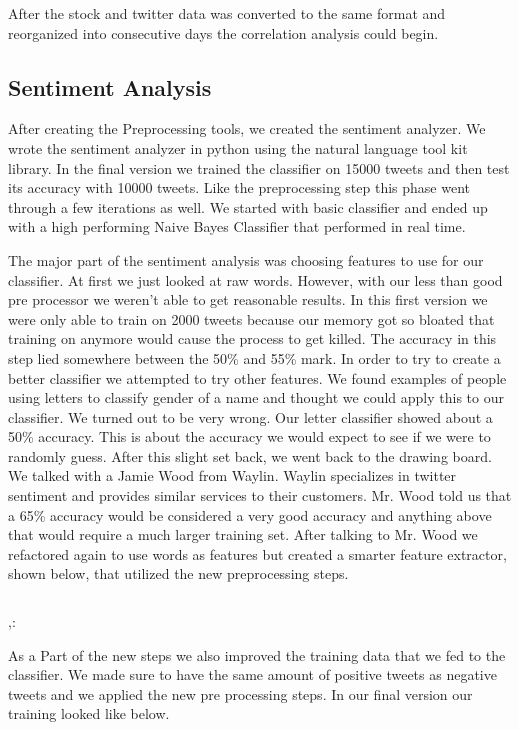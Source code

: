 \documentclass{acm_proc_article-sp}
\begin{document}
After the stock and twitter data was converted to the same format and
reorganized into consecutive days the correlation analysis could begin. 

\subsection{Sentiment Analysis}

After creating the Preprocessing tools, we created the sentiment analyzer.  We
wrote the sentiment analyzer in python using the natural language tool kit
library. In the final version we trained the classifier on 15000 tweets and
then test its accuracy with 10000 tweets. Like the preprocessing step this
phase went through a few iterations as well. We started with basic classifier
and ended up with a high performing Naive Bayes Classifier that performed in
real time.

The major part of the sentiment analysis was choosing features to use for our
classifier. At first we just looked at raw words. However, with our less than
good pre processor we weren't able to get reasonable results. In this first
version we were only able to train on 2000 tweets because our memory got so
bloated that training on anymore would cause the process to get killed. The
accuracy in this step lied somewhere between the 50\% and 55\% mark. In order
to try to create a better classifier we attempted to try other features. We
found examples of people using letters to classify gender of a name and thought
we could apply this to our classifier. We turned out to be very wrong. Our
letter classifier showed about a 50\% accuracy. This is about the accuracy we
would expect to see if we were to randomly guess. After this slight set back, we
went back to the drawing board.  We talked with a Jamie Wood from Waylin.
Waylin specializes in twitter sentiment and provides similar services to their
customers. Mr. Wood told us that a 65\% accuracy would be considered a very good
accuracy and anything above that would require a much larger training set.
After talking to Mr. Wood we refactored again to use words as features but
created a smarter feature extractor, shown below, that utilized the new
preprocessing steps.

\inputminted{python}{examples/featureExtractor.py},:

As a Part of the new steps we also improved the training data that we fed to the
classifier.  We made sure to have the same amount of positive tweets as
negative tweets and we applied the new pre processing steps. In our final
version our training looked like below.
\end{document}
